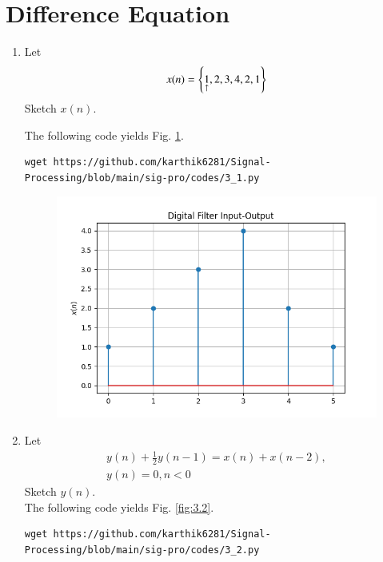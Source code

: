 \documentclass[journal,12pt,twocolumn]{IEEEtran}
\renewcommand\thesection{\arabic{section}}
\begin{document}
\section{Difference Equation}
\begin{enumerate}[label=\thesection.\arabic*,ref=\thesection.\theenumi]
\item Let
\begin{equation}
x(n) = \left\{\underset{\uparrow}{1},2,3,4,2,1\right\} \label{x(n)}
\end{equation}
Sketch $x(n)$.

\solution The following code yields Fig. \ref{fig:3.1}.
\begin{lstlisting}
wget https://github.com/karthik6281/Signal-Processing/blob/main/sig-pro/codes/3_1.py
\end{lstlisting} 
	\begin{figure}[!ht]
	\begin{center}
		\includegraphics[width=\columnwidth]{./figs/3_1.png}
	\end{center}
	\label{fig:3.1}	
\end{figure}
\item Let
\begin{multline}
\label{eq:iir_filter}
y(n) + \frac{1}{2}y(n-1) = x(n) + x(n-2), 
\\
 y(n) = 0, n < 0
\end{multline}
Sketch $y(n)$.
\\
\solution The following code yields Fig. \ref{fig:3.2}.
\begin{lstlisting}
wget https://github.com/karthik6281/Signal-Processing/blob/main/sig-pro/codes/3_2.py
\end{lstlisting}

\end{enumerate}
\end{document}

